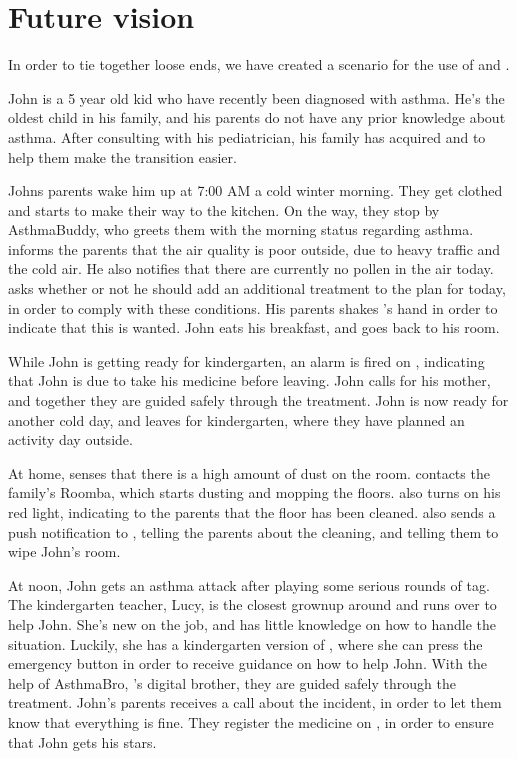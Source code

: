 \section{Future vision}
\label{sec:futurevision}

In order to tie together loose ends, we have created a scenario for the use of \app{} and \buddy{}.

John is a 5 year old kid who have recently been diagnosed with asthma. He's the oldest child in his family, and his parents do not have any prior knowledge about asthma. After consulting with his pediatrician, his family has acquired \buddy{} and \app{} to help them make the transition easier. 

Johns parents wake him up at 7:00 AM a cold winter morning. They get clothed and starts to make their way to the kitchen. On the way, they stop by AsthmaBuddy, who greets them with the morning status regarding asthma. \buddy{} informs the parents that the air quality is poor outside, due to heavy traffic and the cold air. He also notifies that there are currently no pollen in the air today. \buddy{} asks whether or not he should add an additional treatment to the plan for today, in order to comply with these conditions. His parents shakes \buddy{}'s hand in order to indicate that this is wanted. John eats his breakfast, and goes back to his room. 

While John is getting ready for kindergarten, an alarm is fired on \buddy{}, indicating that John is due to take his medicine before leaving. John calls for his mother, and together they are guided safely through the treatment. John is now ready for another cold day, and leaves for kindergarten, where they have planned an activity day outside. 

At home, \buddy{} senses that there is a high amount of dust on the room. \buddy{} contacts the family's Roomba, which starts dusting and mopping the floors. \buddy{} also turns on his red light, indicating to the parents that the floor has been cleaned. \buddy{} also sends a push notification to \app{}, telling the parents about the cleaning, and telling them to wipe John's room. 

At noon, John gets an asthma attack after playing some serious rounds of tag. The kindergarten teacher, Lucy, is the closest grownup around and runs over to help John. She's new on the job, and has little knowledge on how to handle the situation. Luckily, she has a kindergarten version of \app{}, where she can press the emergency button in order to receive guidance on how to help John. With the help of AsthmaBro, \buddy{}'s digital brother, they are guided safely through the treatment. John's parents receives a call about the incident, in order to let them know that everything is fine. They register the medicine on \app{}, in order to ensure that John gets his stars.

